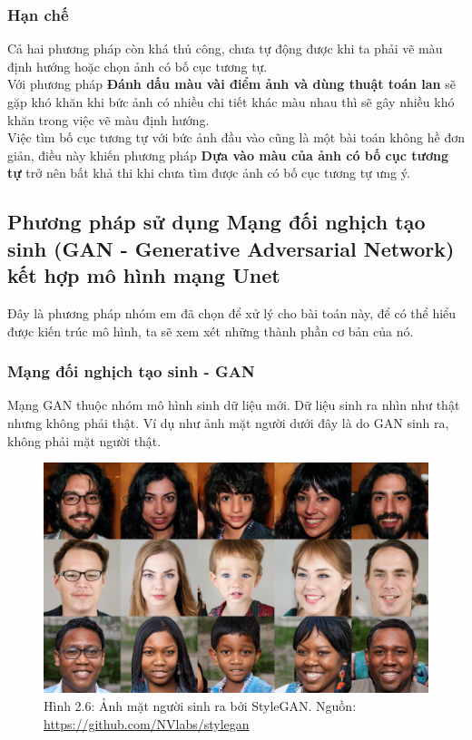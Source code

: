\documentclass[a4paper]{article}
\begin{document}
\subsubsection{Hạn chế}
Cả hai phương pháp còn khá thủ công, chưa tự động được khi ta phải vẽ màu định hướng hoặc chọn ảnh có bố cục tương tự.\\
Với phương pháp \textbf{Đánh dấu màu vài điểm ảnh và dùng thuật toán lan} sẽ gặp khó khăn khi bức ảnh có nhiều chi tiết khác màu nhau thì sẽ gây nhiều khó khăn trong việc vẽ màu định hướng.\\
Việc tìm bố cục tương tự với bức ảnh đầu vào cũng là một bài toán không hề đơn giản, điều này khiến phương pháp \textbf{Dựa vào màu của ảnh có bố cục tương tự} trở nên bất khả thi khi chưa tìm được ảnh có bố cục tương tự ưng ý.

\subsection{Phương pháp sử dụng Mạng đối nghịch tạo sinh (GAN - Generative Adversarial Network) kết hợp mô hình mạng Unet}

Đây là phương pháp nhóm em đã chọn để xử lý cho bài toán này, để có thể hiểu được kiến trúc mô hình, ta sẽ xem xét những thành phần cơ bản của nó.

\subsubsection{Mạng đối nghịch tạo sinh - GAN}
Mạng GAN thuộc nhóm mô hình sinh dữ liệu mới. Dữ liệu sinh ra nhìn như thật nhưng không phải thật. Ví dụ như ảnh mặt người dưới đây là do GAN sinh ra, không phải mặt người thật.

\begin{figure}[h!]
\centering
\includegraphics[width=13cm]{images/2_6.PNG}
\caption{Hình 2.6: Ảnh mặt người sinh ra bởi StyleGAN. Nguồn: \href{https://github.com/NVlabs/stylegan}{https://github.com/NVlabs/stylegan}}
\end{figure}
\end{document}
